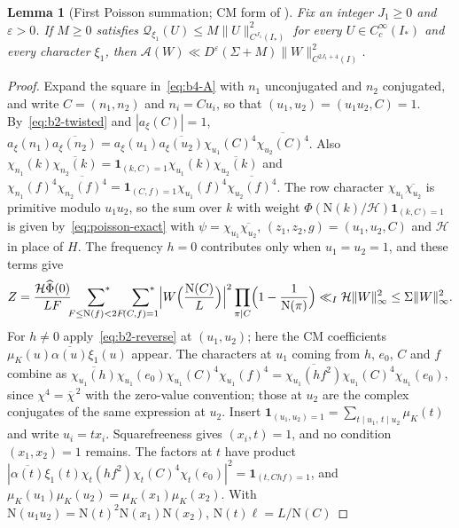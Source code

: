 \documentclass[11pt]{article}
\numberwithin{equation}{section}
\newcommand{\N}{\mathrm N}
\newcommand{\muk}{\mu_K}
\newcommand{\ind}{\mathbf1}
\newcommand{\ssum}{\sideset{}{^*}\sum}
\newtheorem{lemma}{Lemma}
\begin{document}
\begin{lemma}[First Poisson summation; CM form of {\cite[Lemma~7.1]{OAI1112}}]\label{lem:b4-first}
Fix an integer $J_1\ge0$ and $\varepsilon>0$. If $M\ge0$ satisfies
$\mathcal Q_{\xi_1}(U)\le M\|U\|_{C^{J_1}(I_*)}^2$ for every $U\in C_c^\infty(I_*)$ and every character
$\xi_1$, then $\mathcal A(W)\ll D^\varepsilon(\Sigma+M)\|W\|_{C^{2J_1+4}(I)}^2$.
\end{lemma}

\begin{proof}
Expand the square in~\eqref{eq:b4-A} with $n_1$ unconjugated and $n_2$ conjugated, and write
$C=(n_1,n_2)$ and $n_i=Cu_i$, so that $(u_1,u_2)=(u_1u_2,C)=1$. By~\eqref{eq:b2-twisted} and $|a_\xi(C)|=1$,
$a_\xi(n_1)\overline{a_\xi(n_2)}=a_\xi(u_1)\overline{a_\xi(u_2)}\chi_{u_1}(C)^4\overline{\chi_{u_2}(C)^4}$.
Also $\chi_{n_1}(k)\overline{\chi_{n_2}(k)}=\ind_{(k,C)=1}\chi_{u_1}(k)\overline{\chi_{u_2}(k)}$ and
$\chi_{n_1}(f)^4\overline{\chi_{n_2}(f)^4}=\ind_{(C,f)=1}\chi_{u_1}(f)^4\overline{\chi_{u_2}(f)^4}$.
The row character $\chi_{u_1}\overline{\chi_{u_2}}$ is primitive modulo $u_1u_2$, so the sum over
$k$ with weight $\Phi(\N(k)/\mathcal H)\ind_{(k,C)=1}$ is given by~\eqref{eq:poisson-exact} with
$\psi=\chi_{u_1}\overline{\chi_{u_2}}$, $(z_1,z_2,g)=(u_1,u_2,C)$ and $\mathcal H$ in place of $H$.
The frequency $h=0$ contributes only when $u_1=u_2=1$, and these terms give
\begin{equation}\label{eq:d063}
 Z=\frac{\mathcal H\widehat\Phi(0)}{LF}\ssum_{F\le\N(f)<2F}\ssum_{(C,f)=1}
 \Bigl|W\Bigl(\frac{\N(C)}L\Bigr)\Bigr|^2\prod_{\pi\mid C}\Bigl(1-\frac1{\N(\pi)}\Bigr)
 \ll_I\mathcal H\|W\|_\infty^2\le\Sigma\|W\|_\infty^2 .
\end{equation}
For $h\ne0$ apply~\eqref{eq:b2-reverse} at $(u_1,u_2)$; here the CM coefficients
$\muk(u)\overline{\alpha(u)}\xi_1(u)$ appear. The characters at $u_1$ coming from $h$, $e_0$, $C$
and $f$ combine as
$\overline{\chi_{u_1}(h)}\chi_{u_1}(e_0)\chi_{u_1}(C)^4\chi_{u_1}(f)^4
=\overline{\chi_{u_1}(hf^2)}\chi_{u_1}(C)^4\chi_{u_1}(e_0)$, since $\chi^4=\overline\chi^{\,2}$
with the zero-value convention; those at $u_2$ are the complex conjugates of the same expression
at $u_2$. Insert $\ind_{(u_1,u_2)=1}=\sum_{t\mid u_1,\,t\mid u_2}\muk(t)$ and write $u_i=tx_i$.
Squarefreeness gives $(x_i,t)=1$, and no condition $(x_1,x_2)=1$ remains. The factors at $t$ have
product $|\overline{\alpha(t)}\xi_1(t)\chi_t(hf^2)\chi_t(C)^4\chi_t(e_0)|^2=\ind_{(t,Chf)=1}$, and
$\muk(u_1)\muk(u_2)=\muk(x_1)\muk(x_2)$. With $\N(u_1u_2)=\N(t)^2\N(x_1)\N(x_2)$, $\N(t)\ell=L/\N(C)$

\end{proof}
\end{document}

